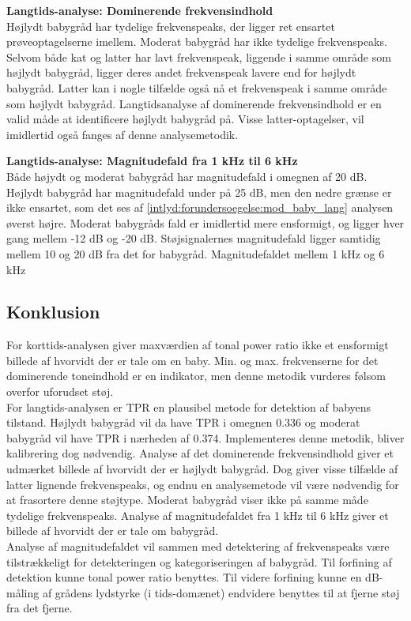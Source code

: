 \textbf{Langtids-analyse: Dominerende frekvensindhold}	\\
Højlydt babygråd har tydelige frekvenspeaks, der ligger ret ensartet prøveoptagelserne imellem. Moderat babygråd har ikke tydelige frekvenspeaks. Selvom både kat og latter har lavt frekvenspeak, liggende i samme område som højlydt babygråd, ligger deres andet frekvenspeak lavere end for højlydt babygråd. Latter kan i nogle tilfælde også nå et frekvenspeak i samme område som højlydt babygråd. Langtidsanalyse af dominerende frekvensindhold er en valid måde at identificere højlydt babygråd på. Visse latter-optagelser, vil imidlertid også fanges af denne analysemetodik.

\textbf{Langtids-analyse: Magnitudefald fra 1 kHz til 6 kHz}	\\
Både højydt og moderat babygråd har magnitudefald i omegnen af 20 dB. Højlydt babygråd har magnitudefald under på 25 dB, men den nedre grænse er ikke ensartet, som det ses af \ref{intlyd:forundersoegelse:mod_baby_lang} analysen øverst højre. Moderat babygråds fald er imidlertid mere ensformigt, og ligger hver gang mellem -12 dB og -20 dB. Støjsignalernes magnitudefald ligger samtidig mellem 10 og 20 dB fra det for babygråd. Magnitudefaldet mellem 1 kHz og 6 kHz

\newpage
\subsection*{Konklusion}
For korttids-analysen giver maxværdien af tonal power ratio ikke et ensformigt billede af hvorvidt der er tale om en baby. Min. og max. frekvenserne for det dominerende toneindhold er en indikator, men denne metodik vurderes følsom overfor uforudset støj. \\
For langtids-analysen er TPR en plausibel metode for detektion af babyens tilstand. Højlydt babygråd vil da have TPR i omegnen 0.336 og moderat babygråd vil have TPR i nærheden af 0.374. Implementeres denne metodik, bliver kalibrering dog nødvendig. Analyse af det dominerende frekvensindhold giver et udmærket billede af hvorvidt der er højlydt babygråd. Dog giver visse tilfælde af latter lignende frekvenspeaks, og endnu en analysemetode vil være nødvendig for at frasortere denne støjtype. Moderat babygråd viser ikke på samme måde tydelige frekvenspeaks. Analyse af magnitudefaldet fra 1 kHz til 6 kHz giver et billede af hvorvidt der er tale om babygråd. \\
Analyse af magnitudefaldet vil sammen med detektering af frekvenspeaks være tilstrækkeligt for detekteringen og kategoriseringen af babygråd. Til forfining af detektion kunne tonal power ratio benyttes. Til videre forfining kunne en dB-måling af grådens lydstyrke (i tids-domænet) endvidere benyttes til at fjerne støj fra det fjerne. 